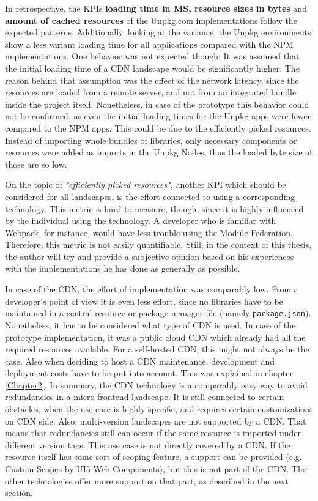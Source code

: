 In retrospective, the KPIs \textbf{loading time in MS, resource sizes in bytes} and \textbf{amount of cached resources} of the Unpkg.com implementations follow the expected patterns. 
Additionally, looking at the variance, the Unpkg environments show a less variant loading time for all applications compared with the NPM implementations. 
One behavior was not expected though: It was assumed that the initial loading time of a CDN landscape would be significantly higher. 
The reason behind that assumption was the effect of the network latency, since the resources are loaded from a remote server, and not from an integrated bundle inside the project itself. 
Nonetheless, in case of the prototype this behavior could not be confirmed, as even the initial loading times for the Unpkg apps were lower compared to the NPM apps. 
This could be due to the efficiently picked resources. 
Instead of importing whole bundles of libraries, only necessary components or resources were added as imports in the Unpkg Nodes, thus the loaded byte size of those are so low.

On the topic of \textit{"efficiently picked resources"}, another KPI which should be considered for all landscapes, is the effort connected to using a corresponding technology. 
This metric is hard to measure, though, since it is highly influenced by the individual using the technology. 
A developer who is familiar with Webpack, for instance, would have less trouble using the Module Federation. 
Therefore, this metric is not easily quantifiable. 
Still, in the context of this thesis, the author will try and provide a subjective opinion based on his experiences with the implementations he has done as generally as possible. 

In case of the CDN, the effort of implementation was comparably low. 
From a developer's point of view it is even less effort, since no libraries have to be maintained in a central resource or package manager file (namely \texttt{package.json}). 
Nonetheless, it has to be considered what type of CDN is used.
In case of the prototype implementation, it was a public cloud CDN which already had all the required resources available. 
For a self-hosted CDN, this might not always be the case. 
Also when deciding to host a CDN maintenance, development and deployment costs have to be put into account. 
This was explained in chapter \ref{Chapter2}.
In summary, the CDN technology is a comparably easy way to avoid redundancies in a micro frontend landscape.
It is still connected to certain obstacles, when the use case is highly specific, and requires certain customizations on CDN side. 
Also, multi-version landscapes are not supported by a CDN. 
That means that redundancies still can occur if the same resource is imported under different version tags. 
This use case is not directly covered by a CDN. 
If the resource itself has some sort of scoping feature, a support can be provided (e.g. Custom Scopes by UI5 Web Components), but this is not part of the CDN. 
The other technologies offer more support on that part, as described in the next section.

